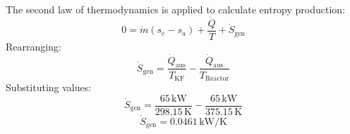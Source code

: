 The second law of thermodynamics is applied to calculate entropy production:  
\[
0 = \dot{m}(s_e - s_a) + \frac{\dot{Q}}{T} + \dot{S}_{\text{gen}}
\]  
Rearranging:  
\[
\dot{S}_{\text{gen}} = \frac{\dot{Q}_{\text{aus}}}{T_{\text{KF}}} - \frac{\dot{Q}_{\text{aus}}}{T_{\text{Reactor}}}
\]  
Substituting values:  
\[
\dot{S}_{\text{gen}} = \frac{65 \, \text{kW}}{298.15 \, \text{K}} - \frac{65 \, \text{kW}}{375.15 \, \text{K}}
\]  
\[
\dot{S}_{\text{gen}} = 0.0461 \, \text{kW/K}
\]